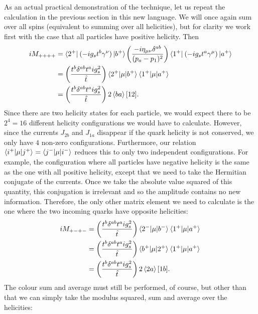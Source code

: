 As an actual practical demonstration of the technique, let us repeat the calculation in the previous section in this new language. We will once again sum over all spins (equivalent to summing over all helicities), but for clarity we work first with the case that all particles have positive helicity. Then
\begin{equation}
\begin{split}
iM_{++++} &= \mathinner{\langle 2^+\rvert}_{}(-i g_s t^b \gamma^\nu) \mathinner{\lvert b^+\rangle}_{\hspace{-0.1em}} \left( \frac{- i \eta_{\mu \nu}\delta^{ab}}{(p_a - p_1)^2} \right)\mathinner{\langle 1^+\rvert}_{} (-i g_s t^a \gamma^\mu)\mathinner{\lvert a^+\rangle}_{\hspace{-0.1em}} \\
& = \left(\frac{t^b \delta^{ab} t^a i g_s^2}{\hat{t}} \right) \mathinner{\langle2^+\vert\mu\vert b^+\rangle}_{} \mathinner{\langle1^+\vert\mu\vert a^+\rangle}_{} \\
& = \left(\frac{t^b \delta^{ab} t^a i g_s^2}{\hat{t}} \right) 2 \left<b a \right> [1 2]. 
\end{split}
\end{equation}
Since there are two helicity states for each particle, we would expect there to be $2^4 = 16$ different helicity configurations we would have to calculate. However, since the currents $J_{2b}$ and $J_{1a}$ disappear if the quark helicity is not conserved, we only have $4$ non-zero configurations. Furthermore, our relation $\mathinner{\langle i^+\vert\mu\vert j^+\rangle}_{} = \mathinner{\langle j^-\vert\mu\vert i^-\rangle}_{}$ reduces this to only two independent configurations. For example, the configuration where all particles have negative helicity is the same as the one with all positive helicity, except that we need to take the Hermitian conjugate of the currents. Once we take the absolute value squared of this quantity, this conjugation is irrelevant and so the amplitude contains no new information. Therefore, the only other matrix element we need to calculate is the one where the two incoming quarks have opposite helicities:
\begin{equation}
\begin{split}
iM_{+-+-} & =  \left(\frac{t^b \delta^{ab} t^a i g_s^2}{\hat{t}} \right) \mathinner{\langle2^-\vert\mu\vert b^-\rangle}_{} \mathinner{\langle1^+\vert\mu\vert a^+\rangle}_{} \\
&=  \left(\frac{t^b \delta^{ab} t^a i g_s^2}{\hat{t}} \right) \mathinner{\langle b^+\vert\mu\vert2^+\rangle}_{} \mathinner{\langle1^+\vert\mu\vert a^+\rangle}_{} \\
&=  \left(\frac{t^b \delta^{ab} t^a i g_s^2}{\hat{t}} \right) 2 \left<2 a \right> [1 b].
\end{split}
\end{equation}
The colour sum and average must still be performed, of course, but other than that we can simply take the modulus squared, sum and average over the helicities:
